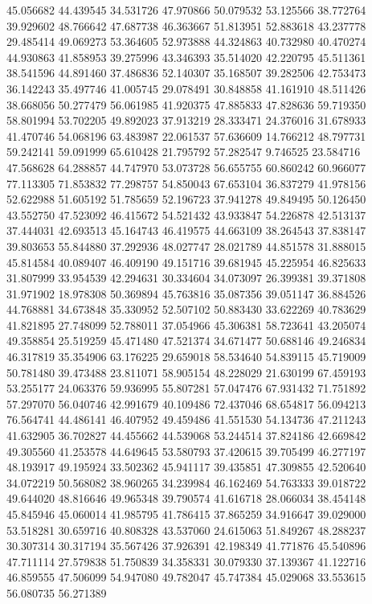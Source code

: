 45.056682
44.439545
34.531726
47.970866
50.079532
53.125566
38.772764
39.929602
48.766642
47.687738
46.363667
51.813951
52.883618
43.237778
29.485414
49.069273
53.364605
52.973888
44.324863
40.732980
40.470274
44.930863
41.858953
39.275996
43.346393
35.514020
42.220795
45.511361
38.541596
44.891460
37.486836
52.140307
35.168507
39.282506
42.753473
36.142243
35.497746
41.005745
29.078491
30.848858
41.161910
48.511426
38.668056
50.277479
56.061985
41.920375
47.885833
47.828636
59.719350
58.801994
53.702205
49.892023
37.913219
28.333471
24.376016
31.678933
41.470746
54.068196
63.483987
22.061537
57.636609
14.766212
48.797731
59.242141
59.091999
65.610428
21.795792
57.282547
9.746525
23.584716
47.568628
64.288857
44.747970
53.073728
56.655755
60.860242
60.966077
77.113305
71.853832
77.298757
54.850043
67.653104
36.837279
41.978156
52.622988
51.605192
51.785659
52.196723
37.941278
49.849495
50.126450
43.552750
47.523092
46.415672
54.521432
43.933847
54.226878
42.513137
37.444031
42.693513
45.164743
46.419575
44.663109
38.264543
37.838147
39.803653
55.844880
37.292936
48.027747
28.021789
44.851578
31.888015
45.814584
40.089407
46.409190
49.151716
39.681945
45.225954
46.825633
31.807999
33.954539
42.294631
30.334604
34.073097
26.399381
39.371808
31.971902
18.978308
50.369894
45.763816
35.087356
39.051147
36.884526
44.768881
34.673848
35.330952
52.507102
50.883430
33.622269
40.783629
41.821895
27.748099
52.788011
37.054966
45.306381
58.723641
43.205074
49.358854
25.519259
45.471480
47.521374
34.671477
50.688146
49.246834
46.317819
35.354906
63.176225
29.659018
58.534640
54.839115
45.719009
50.781480
39.473488
23.811071
58.905154
48.228029
21.630199
67.459193
53.255177
24.063376
59.936995
55.807281
57.047476
67.931432
71.751892
57.297070
56.040746
42.991679
40.109486
72.437046
68.654817
56.094213
76.564741
44.486141
46.407952
49.459486
41.551530
54.134736
47.211243
41.632905
36.702827
44.455662
44.539068
53.244514
37.824186
42.669842
49.305560
41.253578
44.649645
53.580793
37.420615
39.705499
46.277197
48.193917
49.195924
33.502362
45.941117
39.435851
47.309855
42.520640
34.072219
50.568082
38.960265
34.239984
46.162469
54.763333
39.018722
49.644020
48.816646
49.965348
39.790574
41.616718
28.066034
38.454148
45.845946
45.060014
41.985795
41.786415
37.865259
34.916647
39.029000
53.518281
30.659716
40.808328
43.537060
24.615063
51.849267
48.288237
30.307314
30.317194
35.567426
37.926391
42.198349
41.771876
45.540896
47.711114
27.579838
51.750839
34.358331
30.079330
37.139367
41.122716
46.859555
47.506099
54.947080
49.782047
45.747384
45.029068
33.553615
56.080735
56.271389
